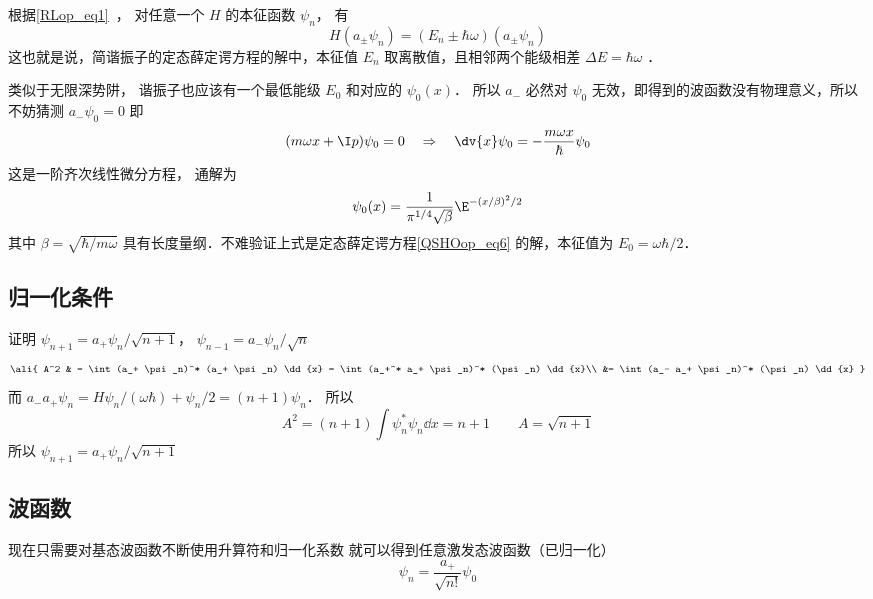 根据\autoref{RLop_eq1}~， 对任意一个 $H$ 的本征函数 $\psi_n$， 有
\begin{equation}
H(a_\pm\psi_n) = (E_n\pm\hbar\omega) (a_ \pm \psi_n)
\end{equation}
这也就是说，简谐振子的定态薛定谔方程的解中，本征值 $E_n$ 取离散值，且相邻两个能级相差 $\Delta E = \hbar \omega$ ．

类似于无限深势阱， 谐振子也应该有一个最低能级 $E_0$ 和对应的 $\psi_0(x)$． 所以 $a_-$ 必然对 $\psi_0$ 无效，即得到的波函数没有物理意义，所以不妨猜测 $a_- \psi_0 = 0$ 
即
\begin{equation}
(m\omega x + \I p)\psi_0 = 0
\quad \Rightarrow \quad
\dv{x} \psi_0 =  - \frac{m\omega x}{\hbar } \psi_0
\end{equation}
这是一阶齐次线性微分方程，%
通解为
\begin{equation}
\psi_0(x) = \frac{1}{\pi^{1/4}\sqrt\beta} \E^{-(x/\beta)^2/2}
\end{equation}
其中 $\beta = \sqrt{\hbar /m\omega}$ 具有长度量纲．不难验证上式是定态薛定谔方程\autoref{QSHOop_eq6} 的解，本征值为 $E_0=\omega\hbar/2$．

\subsection{归一化条件}

证明 $\psi_{n+1} = a_+\psi_n/\sqrt{n+1}$，  $\psi_{n-1} = a_- \psi_n/\sqrt n$ 
\begin{equation}\ali{
A^2 & = \int (a_+ \psi_n)^* (a_+ \psi_n) \dd{x}
= \int (a_+^* a_+ \psi_n)^* (\psi_n) \dd{x}\\
&= \int (a_- a_+ \psi_n)^* (\psi_n) \dd{x}
}\end{equation}
而 $a_- a_+ \psi_n = H\psi_n/(\omega\hbar) + \psi_n/2 = (n + 1)\psi_n$． 所以
\begin{equation}
A^2 = (n + 1)\int \psi_n^*{\psi_n} \dd{x}  = n + 1\qquad
A = \sqrt{n+1}
\end{equation}
所以 $\psi_{n+1} = a_+ \psi_n/\sqrt{n+1}$

\subsection{波函数}
现在只需要对基态波函数不断使用升算符和归一化系数%
就可以得到任意激发态波函数（已归一化）
\begin{equation}
\psi_n = \frac{a_+}{\sqrt {n!}} \psi_0
\end{equation}


